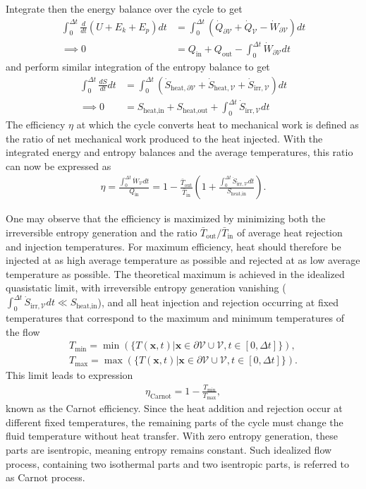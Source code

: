 Integrate then the energy balance over the cycle to get
\begin{align}
    \int_0^{\Delta t}\frac{d}{dt}(U+E_k+E_p)dt&=\int_0^{\Delta t}\left(\dot{Q}_{\partial \mathcal{V}}+\dot{Q}_{\mathcal{V}}-\dot{W}_{\partial \mathcal{V}}\right)dt\nonumber\\
    \implies 0&=Q_\text{in}+Q_\text{out}-\int_0^{\Delta t}\dot{W}_{\partial\mathcal{V}}dt
\end{align}
and perform similar integration of the entropy balance to get
\begin{align}
    \int_{0}^{\Delta t}\frac{dS}{dt}dt&=\int_0^{\Delta t}\left(\dot{S}_{\text{heat},\partial \mathcal{V}}+\dot{S}_{\text{heat},\mathcal{V}}+\dot{S}_{\text{irr},\mathcal{V}}\right)dt\nonumber\\    
    \implies 0&=S_\text{heat,in}+S_\text{heat,out}+\int_0^{\Delta t}\dot{S}_{\text{irr},\mathcal{V}}dt
\end{align}
The efficiency $\eta$ at which the cycle converts heat to mechanical work is defined as the ratio of net mechanical work produced to the heat injected. With the integrated energy and entropy balances and the average temperatures, this ratio can now be expressed as
\begin{align}
    \eta=\frac{\int_0^{\Delta t}\dot{W}_\mathcal{V}dt}{Q_\text{in}}=1-\frac{\bar{T}_\text{out}}{\bar{T}_\text{in}}\left(1+\frac{\int_0^{\Delta t}\dot{S}_{\text{irr},\mathcal{V}}dt}{S_\text{heat,in}}\right).
\end{align}

One may observe that the efficiency is maximized by minimizing both the irreversible entropy generation and the ratio $\bar{T}_\text{out}/\bar{T}_\text{in}$ of average heat rejection and injection temperatures. For maximum efficiency, heat should therefore be injected at as high average temperature as possible and rejected at as low average temperature as possible. The theoretical maximum is achieved in the idealized quasistatic limit, with irreversible entropy generation vanishing ($\int_0^{\Delta t}\dot{S}_{\text{irr},\mathcal{V}}dt\ll S_\text{heat,in}$), and all heat injection and rejection occurring at fixed temperatures that correspond to the maximum and minimum temperatures of the flow
\begin{align}
    T_\text{min}=\min(\{T(\bm{x},t)|\bm{x}\in\partial\mathcal{V}\cup\mathcal{V},t\in[0,\Delta t]\}),\\
    T_\text{max}=\max(\{T(\bm{x},t)|\bm{x}\in\partial\mathcal{V} \cup\mathcal{V},t\in[0,\Delta t]\}).
\end{align}
This limit leads to expression
\begin{align}
    \eta_\text{Carnot}=1-\frac{T_\text{min}}{T_\text{max}},
\end{align}
known as the Carnot efficiency. Since the heat addition and rejection occur at different fixed temperatures, the remaining parts of the cycle must change the fluid temperature without heat transfer. With zero entropy generation, these parts are isentropic, meaning entropy remains constant. Such idealized flow process, containing two isothermal parts and two isentropic parts, is referred to as Carnot process. 

